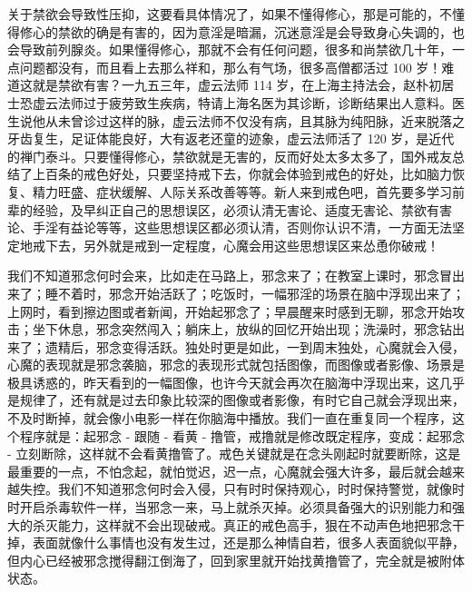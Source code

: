 关于禁欲会导致性压抑，这要看具体情况了，如果不懂得修心，那是可能的，不懂得修心的禁欲的确是有害的，因为意淫是暗漏，沉迷意淫是会导致身心失调的，也会导致前列腺炎。如果懂得修心，那就不会有任何问题，很多和尚禁欲几十年，一点问题都没有，而且看上去那么祥和，那么有气场，很多高僧都活过 100 岁！难道这就是禁欲有害？一九五三年，虚云法师 114 岁，在上海主持法会，赵朴初居士恐虚云法师过于疲劳致生疾病，特请上海名医为其诊断，诊断结果出人意料。医生说他从未曾诊过这样的脉，虚云法师不仅没有病，且其脉为纯阳脉，近来脱落之牙齿复生，足证体能良好，大有返老还童的迹象，虚云法师活了 120 岁，是近代的禅门泰斗。只要懂得修心，禁欲就是无害的，反而好处太多太多了，国外戒友总结了上百条的戒色好处，只要坚持戒下去，你就会体验到戒色的好处，比如脑力恢复、精力旺盛、症状缓解、人际关系改善等等。新人来到戒色吧，首先要多学习前辈的经验，及早纠正自己的思想误区，必须认清无害论、适度无害论、禁欲有害论、手淫有益论等等，这些思想误区都必须认清，否则你认识不清，一方面无法坚定地戒下去，另外就是戒到一定程度，心魔会用这些思想误区来怂恿你破戒！

我们不知道邪念何时会来，比如走在马路上，邪念来了；在教室上课时，邪念冒出来了；睡不着时，邪念开始活跃了；吃饭时，一幅邪淫的场景在脑中浮现出来了；上网时，看到擦边图或者新闻，开始起邪念了；早晨醒来时感到无聊，邪念开始攻击；坐下休息，邪念突然闯入；躺床上，放纵的回忆开始出现；洗澡时，邪念钻出来了；遗精后，邪念变得活跃。独处时更是如此，一到周末独处，心魔就会入侵，心魔的表现就是邪念袭脑，邪念的表现形式就包括图像，而图像或者影像、场景是极具诱惑的，昨天看到的一幅图像，也许今天就会再次在脑海中浮现出来，这几乎是规律了，还有就是过去印象比较深的图像或者影像，有时它自己就会浮现出来，不及时断掉，就会像小电影一样在你脑海中播放。我们一直在重复同一个程序，这个程序就是：起邪念 - 跟随 - 看黄 - 撸管，戒撸就是修改既定程序，变成：起邪念 - 立刻断除，这样就不会看黄撸管了。戒色关键就是在念头刚起时就要断除，这是最重要的一点，不怕念起，就怕觉迟，迟一点，心魔就会强大许多，最后就会越来越失控。我们不知道邪念何时会入侵，只有时时保持观心，时时保持警觉，就像时时开启杀毒软件一样，当邪念一来，马上就杀灭掉。必须具备强大的识别能力和强大的杀灭能力，这样就不会出现破戒。真正的戒色高手，狠在不动声色地把邪念干掉，表面就像什么事情也没有发生过，还是那么神情自若，很多人表面貌似平静，但内心已经被邪念搅得翻江倒海了，回到家里就开始找黄撸管了，完全就是被附体状态。


